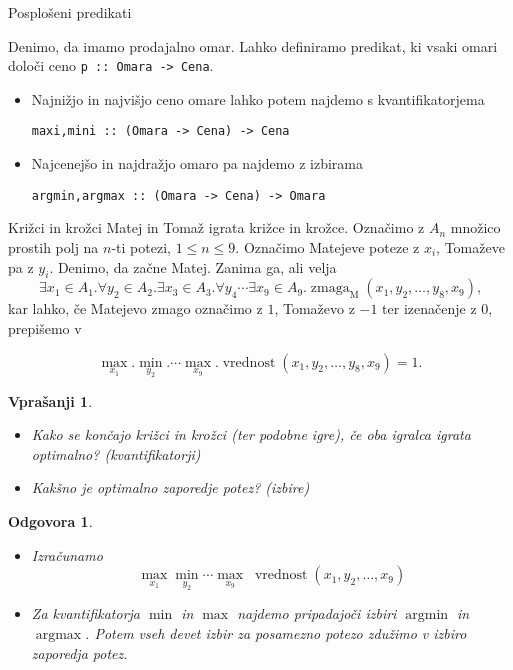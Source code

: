 \documentclass{beamer}
\newtheorem{vpr}{Vprašanji}
\newtheorem{odg}{Odgovora}
\def\obs{\exists}
\def\fora{\forall}
\newcommand{\argmin}{\operatorname{argmin}}
\newcommand{\argmax}{\operatorname{argmax}}
\begin{document}
\begin{frame}[fragile]{Posplošeni predikati}

Denimo, da imamo prodajalno omar. Lahko definiramo predikat, ki vsaki omari določi ceno \lstinline$p :: Omara -> Cena$. 
\begin{itemize}
\item Najnižjo in najvišjo ceno omare lahko potem najdemo s kvantifikatorjema
\begin{lstlisting}
maxi,mini :: (Omara -> Cena) -> Cena
\end{lstlisting}
\item Najcenejšo in najdražjo omaro pa najdemo z izbirama
\begin{lstlisting}
argmin,argmax :: (Omara -> Cena) -> Omara
\end{lstlisting}
\end{itemize}
\end{frame}

\begin{frame}{Križci in krožci}
Matej in Tomaž igrata križce in krožce. Označimo z $A_n$ množico prostih polj na $n$-ti potezi, $1\leq n\leq 9$.
Označimo Matejeve poteze z $x_i$, Tomaževe pa z $y_i$. Denimo, da začne Matej.  Zanima ga, ali velja
$$\obs x_1\in A_1.\fora y_2 \in A_2. \obs x_3\in A_3.\fora y_4 \cdots \obs x_9 \in A_9. \operatorname{zmaga}_\text{M}(x_1,y_2,\dots, y_8,x_9) \text{,}$$
\pause
kar lahko, če Matejevo zmago označimo z $1$, Tomaževo z $-1$ ter izenačenje z $0$, prepišemo v

$$\max_{x_1}. \min_{y_2}. \cdots \max_{x_9}. \operatorname{vrednost}(x_1, y_2,\dots, y_8, x_9) = 1\text{.}$$


\end{frame}

\begin{frame}
\begin{vpr}
	\begin{itemize}
	\item Kako se končajo križci in krožci (ter podobne igre), če oba igralca igrata optimalno? (kvantifikatorji)
	\item Kakšno je optimalno zaporedje potez? (izbire)
	\end{itemize}
\end{vpr}
\pause
\begin{odg}
	\begin{itemize}
	\item Izračunamo $$\max_{x_1}\min_{y_2}\cdots \max_{x_9}\;\operatorname{vrednost}(x_1, y_2,\dots, x_9)$$
	\item Za kvantifikatorja $\min$ in $\max$ najdemo pripadajoči izbiri $\argmin$ in $\argmax$. Potem vseh devet izbir
	za posamezno potezo zdužimo v izbiro zaporedja potez.
	\end{itemize}
\end{odg}

\end{frame}
\end{document}
